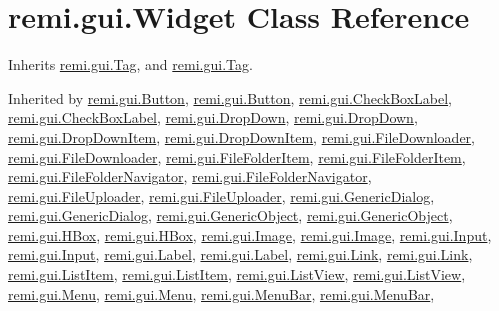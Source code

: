 \hypertarget{classremi_1_1gui_1_1Widget}{}\section{remi.\+gui.\+Widget Class Reference}
\label{classremi_1_1gui_1_1Widget}


Inherits \hyperlink{classremi_1_1gui_1_1Tag}{remi.\+gui.\+Tag}, and \hyperlink{classremi_1_1gui_1_1Tag}{remi.\+gui.\+Tag}.



Inherited by \hyperlink{classremi_1_1gui_1_1Button}{remi.\+gui.\+Button}, \hyperlink{classremi_1_1gui_1_1Button}{remi.\+gui.\+Button}, \hyperlink{classremi_1_1gui_1_1CheckBoxLabel}{remi.\+gui.\+Check\+Box\+Label}, \hyperlink{classremi_1_1gui_1_1CheckBoxLabel}{remi.\+gui.\+Check\+Box\+Label}, \hyperlink{classremi_1_1gui_1_1DropDown}{remi.\+gui.\+Drop\+Down}, \hyperlink{classremi_1_1gui_1_1DropDown}{remi.\+gui.\+Drop\+Down}, \hyperlink{classremi_1_1gui_1_1DropDownItem}{remi.\+gui.\+Drop\+Down\+Item}, \hyperlink{classremi_1_1gui_1_1DropDownItem}{remi.\+gui.\+Drop\+Down\+Item}, \hyperlink{classremi_1_1gui_1_1FileDownloader}{remi.\+gui.\+File\+Downloader}, \hyperlink{classremi_1_1gui_1_1FileDownloader}{remi.\+gui.\+File\+Downloader}, \hyperlink{classremi_1_1gui_1_1FileFolderItem}{remi.\+gui.\+File\+Folder\+Item}, \hyperlink{classremi_1_1gui_1_1FileFolderItem}{remi.\+gui.\+File\+Folder\+Item}, \hyperlink{classremi_1_1gui_1_1FileFolderNavigator}{remi.\+gui.\+File\+Folder\+Navigator}, \hyperlink{classremi_1_1gui_1_1FileFolderNavigator}{remi.\+gui.\+File\+Folder\+Navigator}, \hyperlink{classremi_1_1gui_1_1FileUploader}{remi.\+gui.\+File\+Uploader}, \hyperlink{classremi_1_1gui_1_1FileUploader}{remi.\+gui.\+File\+Uploader}, \hyperlink{classremi_1_1gui_1_1GenericDialog}{remi.\+gui.\+Generic\+Dialog}, \hyperlink{classremi_1_1gui_1_1GenericDialog}{remi.\+gui.\+Generic\+Dialog}, \hyperlink{classremi_1_1gui_1_1GenericObject}{remi.\+gui.\+Generic\+Object}, \hyperlink{classremi_1_1gui_1_1GenericObject}{remi.\+gui.\+Generic\+Object}, \hyperlink{classremi_1_1gui_1_1HBox}{remi.\+gui.\+H\+Box}, \hyperlink{classremi_1_1gui_1_1HBox}{remi.\+gui.\+H\+Box}, \hyperlink{classremi_1_1gui_1_1Image}{remi.\+gui.\+Image}, \hyperlink{classremi_1_1gui_1_1Image}{remi.\+gui.\+Image}, \hyperlink{classremi_1_1gui_1_1Input}{remi.\+gui.\+Input}, \hyperlink{classremi_1_1gui_1_1Input}{remi.\+gui.\+Input}, \hyperlink{classremi_1_1gui_1_1Label}{remi.\+gui.\+Label}, \hyperlink{classremi_1_1gui_1_1Label}{remi.\+gui.\+Label}, \hyperlink{classremi_1_1gui_1_1Link}{remi.\+gui.\+Link}, \hyperlink{classremi_1_1gui_1_1Link}{remi.\+gui.\+Link}, \hyperlink{classremi_1_1gui_1_1ListItem}{remi.\+gui.\+List\+Item}, \hyperlink{classremi_1_1gui_1_1ListItem}{remi.\+gui.\+List\+Item}, \hyperlink{classremi_1_1gui_1_1ListView}{remi.\+gui.\+List\+View}, \hyperlink{classremi_1_1gui_1_1ListView}{remi.\+gui.\+List\+View}, \hyperlink{classremi_1_1gui_1_1Menu}{remi.\+gui.\+Menu}, \hyperlink{classremi_1_1gui_1_1Menu}{remi.\+gui.\+Menu}, \hyperlink{classremi_1_1gui_1_1MenuBar}{remi.\+gui.\+Menu\+Bar}, \hyperlink{classremi_1_1gui_1_1MenuBar}{remi.\+gui.\+Menu\+Bar}, 